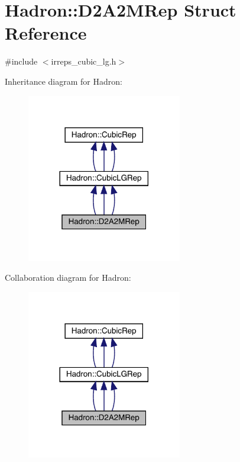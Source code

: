 \hypertarget{structHadron_1_1D2A2MRep}{}\section{Hadron\+:\+:D2\+A2\+M\+Rep Struct Reference}
\label{structHadron_1_1D2A2MRep}


{\ttfamily \#include $<$irreps\+\_\+cubic\+\_\+lg.\+h$>$}



Inheritance diagram for Hadron\+:
\nopagebreak
\begin{figure}[H]
\begin{center}
\leavevmode
\includegraphics[width=192pt]{df/d3f/structHadron_1_1D2A2MRep__inherit__graph}
\end{center}
\end{figure}


Collaboration diagram for Hadron\+:
\nopagebreak
\begin{figure}[H]
\begin{center}
\leavevmode
\includegraphics[width=192pt]{dd/dad/structHadron_1_1D2A2MRep__coll__graph}
\end{center}
\end{figure}
